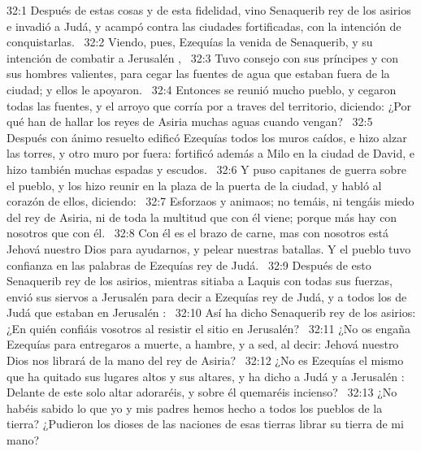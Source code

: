 																																
																																32:1 Después de estas cosas y de esta fidelidad, vino Senaquerib rey de los asirios e invadió a Judá, y acampó contra las ciudades fortificadas, con la intención de conquistarlas.  
																																32:2 Viendo, pues, Ezequías la venida de Senaquerib, y su intención de combatir a Jerusalén ,  
																																32:3 Tuvo consejo con sus príncipes y con sus hombres valientes, para cegar las fuentes de agua que estaban fuera de la ciudad; y ellos le apoyaron.  
																																32:4 Entonces se reunió mucho pueblo, y cegaron todas las fuentes, y el arroyo que corría por a traves del territorio, diciendo: ¿Por qué han de hallar los reyes de Asiria muchas aguas cuando vengan?  
																																32:5 Después con ánimo resuelto edificó Ezequías todos los muros caídos, e hizo alzar las torres, y otro muro por fuera: fortificó además a Milo en la ciudad de David, e hizo también muchas espadas y escudos.  
																																32:6 Y puso capitanes de guerra sobre el pueblo, y los hizo reunir en la plaza de la puerta de la ciudad, y habló al corazón de ellos, diciendo:  
																																32:7 Esforzaos y animaos; no temáis, ni tengáis miedo del rey de Asiria, ni de toda la multitud que con él viene; porque más hay con nosotros que con él.  
																																32:8 Con él es el brazo de carne, mas con nosotros está Jehová nuestro Dios para ayudarnos, y pelear nuestras batallas. Y el pueblo tuvo confianza en las palabras de Ezequías rey de Judá.  
																																32:9 Después de esto Senaquerib rey de los asirios, mientras sitiaba a Laquis con todas sus fuerzas, envió sus siervos a Jerusalén para decir a Ezequías rey de Judá, y a todos los de Judá que estaban en Jerusalén :  
																																32:10 Así ha dicho Senaquerib rey de los asirios: ¿En quién confiáis vosotros al resistir el sitio en Jerusalén?  
																																32:11 ¿No os engaña Ezequías para entregaros a muerte, a hambre, y a sed, al decir: Jehová nuestro Dios nos librará de la mano del rey de Asiria?  
																																32:12 ¿No es Ezequías el mismo que ha quitado sus lugares altos y sus altares, y ha dicho a Judá y a Jerusalén : Delante de este solo altar adoraréis, y sobre él quemaréis incienso?  
																																32:13 ¿No habéis sabido lo que yo y mis padres hemos hecho a todos los pueblos de la tierra? ¿Pudieron los dioses de las naciones de esas tierras librar su tierra de mi mano?  
